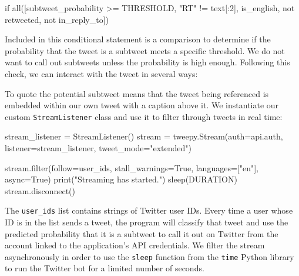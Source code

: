 \documentclass[11pt, twoside, reqno]{book}
\begin{document}
\begin{python}
if all([subtweet_probability >= THRESHOLD,
        "RT" != text[:2], is_english, 
        not retweeted, not in_reply_to])
\end{python} 

\noindent
Included in this conditional statement is a comparison to determine if the probability that the tweet is a subtweet meets a specific threshold. We do not want to call out subtweets unless the probability is high enough. Following this check, we can interact with the tweet in several ways:


\noindent
To quote the potential subtweet means that the tweet being referenced is embedded within our own tweet with a caption above it. We instantiate our custom \verb|StreamListener| class and use it to filter through tweets in real time:

\begin{python}
stream_listener = StreamListener()
stream = tweepy.Stream(auth=api.auth, listener=stream_listener, tweet_mode="extended")

stream.filter(follow=user_ids, stall_warnings=True, languages=["en"], async=True)
print("Streaming has started.")
sleep(DURATION)
stream.disconnect()
\end{python}

\noindent
The \verb|user_ids| list contains strings of Twitter user IDs. Every time a user whose ID is in the list sends a tweet, the program will classify that tweet and use the predicted probability that it is a subtweet to call it out on Twitter from the account linked to the application's API credentials. We filter the stream asynchronously in order to use the \verb|sleep| function from the \verb|time| Python library to run the Twitter bot for a limited number of seconds.
\end{document}
